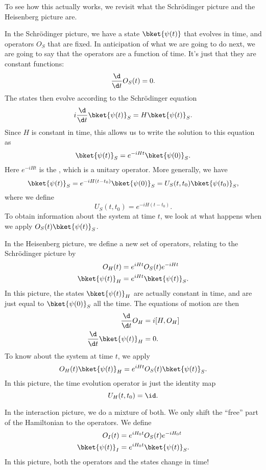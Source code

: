 \documentclass[a4paper]{article}
\begin{document}
To see how this actually works, we revisit what the Schr\"odinger picture and the Heisenberg picture are.

\separator

In the Schr\"odinger picture, we have a state $\bket{\psi(t)}$ that evolves in time, and operators $O_S$ that are fixed. In anticipation of what we are going to do next, we are going to say that the operators are a function of time. It's just that they are constant functions:
\[
  \frac{\d}{\d t}O_S(t) = 0.
\]
The states then evolve according to the Schr\"odinger equation
\[
  i \frac{\d}{\d t} \bket{\psi(t)}_S = H \bket{\psi(t)}_S.
\]
Since $H$ is constant in time, this allows us to write the solution to this equation as
\[
  \bket{\psi(t)}_S = e^{-iHt} \bket{\psi(0)}_S.
\]
Here $e^{-iHt}$ is the , which is a unitary operator. More generally, we have
\[
  \bket{\psi(t)}_S = e^{-iH(t - t_0)} \bket{\psi(0)}_S = U_S(t, t_0) \bket{\psi(t_0)}_S,
\]
where we define
\[
  U_S(t, t_0) = e^{-iH(t - t_0)}.
\]
To obtain information about the system at time $t$, we look at what happens when we apply $O_S(t) \bket{\psi(t)}_S$.

\separator

In the Heisenberg picture, we define a new set of operators, relating to the Schr\"odinger picture by
\begin{align*}
  O_H(t) &= e^{iHt} O_S(t) e^{-iHt}\\
  \bket{\psi(t)}_H &= e^{iHt}\bket{\psi(t)}_S.
\end{align*}
In this picture, the states $\bket{\psi(t)}_H$ are actually constant in time, and are just equal to $\bket{\psi(0)}_S$ all the time. The equations of motion are then
\begin{align*}
  \frac{\d}{\d t}O_H &= i [H, O_H]\\
  \frac{\d}{\d t}\bket{\psi(t)}_H &= 0.
\end{align*}
To know about the system at time $t$, we apply
\[
  O_H(t) \bket{\psi(t)}_H = e^{iHt}O_S(t) \bket{\psi(t)}_S.
\]
In this picture, the time evolution operator is just the identity map
\[
  U_H(t, t_0) = \id.
\]
\separator

In the interaction picture, we do a mixture of both. We only shift the ``free'' part of the Hamiltonian to the operators. We define
\begin{align*}
  O_I(t) &= e^{iH_0 t}O_S(t) e^{-iH_0 t}\\
  \bket{\psi(t)}_I &= e^{iH_0 t}\bket{\psi(t)}_S.
\end{align*}
In this picture, both the operators and the states change in time!
\end{document}
